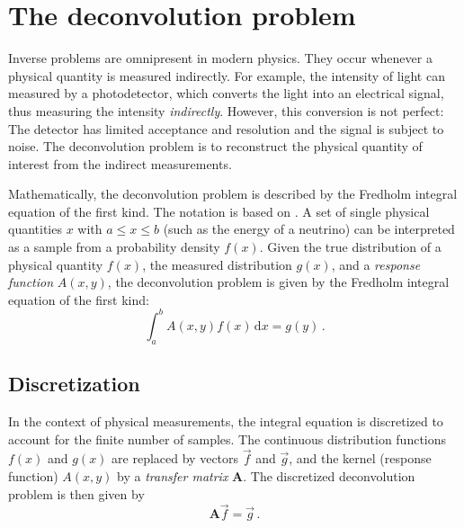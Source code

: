 \section{The deconvolution problem} %
Inverse problems are omnipresent in modern physics.
They occur whenever a physical quantity is measured indirectly.
For example,
the intensity of light can measured by a photodetector,
  which converts the light into an electrical signal,
    thus measuring the intensity \emph{indirectly}.
However,
this conversion is not perfect:
The detector has limited acceptance and resolution
and the signal is subject to noise.
%
The deconvolution problem is to reconstruct the physical quantity of interest
  from the indirect measurements.

Mathematically,
the deconvolution problem is described by the Fredholm integral equation of the first kind.
%
The notation is based on \citeauthor{deconvolution_blobel} \cite{deconvolution_blobel}.
A set of single physical quantities $x$
  with $a \leq x \leq b$ %
  (such as the energy of a neutrino)
can be interpreted as a sample from a probability density $f(x)$.
%
Given
  the true distribution of a physical quantity $f(x)$,
  the measured distribution $g(x)$,
  and a \emph{response function} $A(x, y)$,
the deconvolution problem is given by
the Fredholm integral equation of the first kind: \cite{deconvolution_blobel}
\begin{equation}
  \label{eq:deconvolution_problem:fredholm}
  \int_a^b A(x, y) f(x) \, \mathrm{d}x = g(y) \, .
\end{equation}


\subsection{Discretization} \label{sec:dsea:deconvolution_problem:discretization}
In the context of physical measurements,
the integral equation is discretized
  to account for the finite number of samples.
The continuous distribution functions $f(x)$ and $g(x)$ are replaced by vectors $\vec{f}$ and $\vec{g}$,
and the kernel (response function) $A(x, y)$ by a \emph{transfer matrix} $\symbf{A}$.
%
The discretized deconvolution problem is then given by
\begin{equation}
  \label{eq:deconvolution_problem:discretized}
  \symbf{A} \vec{f} = \vec{g} \, .
\end{equation}


